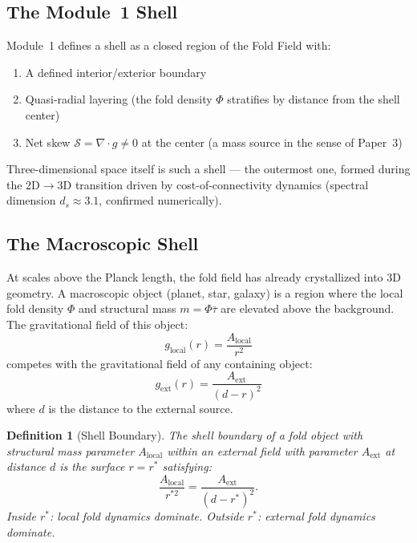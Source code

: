 \documentclass[12pt]{article}
\newtheorem{definition}{Definition}
\newcommand{\taubar}{\bar{\tau}}
\newcommand{\Phifield}{\Phi}
\begin{document}
\subsection{The Module~1 Shell}

Module~1 defines a shell as a closed region of the Fold Field with:
\begin{enumerate}
  \item A defined interior/exterior boundary
  \item Quasi-radial layering (the fold density $\Phifield$ stratifies
        by distance from the shell center)
  \item Net skew $\mathcal{S} = \nabla\cdot g \neq 0$ at the center
        (a mass source in the sense of Paper~3)
\end{enumerate}
Three-dimensional space itself is such a shell --- the outermost one,
formed during the 2D$\to$3D transition driven by cost-of-connectivity
dynamics (spectral dimension $d_s \approx 3.1$, confirmed numerically).

\subsection{The Macroscopic Shell}

At scales above the Planck length, the fold field has already crystallized
into 3D geometry. A macroscopic object (planet, star, galaxy) is a region
where the local fold density $\Phifield$ and structural mass $m = \Phifield\taubar$
are elevated above the background. The gravitational field of this object:
\begin{equation}
  g_{\mathrm{local}}(r) = \frac{A_{\mathrm{local}}}{r^2}
\end{equation}
competes with the gravitational field of any containing object:
\begin{equation}
  g_{\mathrm{ext}}(r) = \frac{A_{\mathrm{ext}}}{(d-r)^2}
\end{equation}
where $d$ is the distance to the external source.

\begin{definition}[Shell Boundary]
  The shell boundary of a fold object with structural mass parameter
  $A_{\mathrm{local}}$ within an external field with parameter
  $A_{\mathrm{ext}}$ at distance $d$ is the surface $r = r^*$ satisfying:
  \begin{equation}
    \frac{A_{\mathrm{local}}}{r^{*2}} = \frac{A_{\mathrm{ext}}}{(d-r^*)^2}.
    \label{eq:boundary}
  \end{equation}
  Inside $r^*$: local fold dynamics dominate.
  Outside $r^*$: external fold dynamics dominate.
\end{definition}
\end{document}
